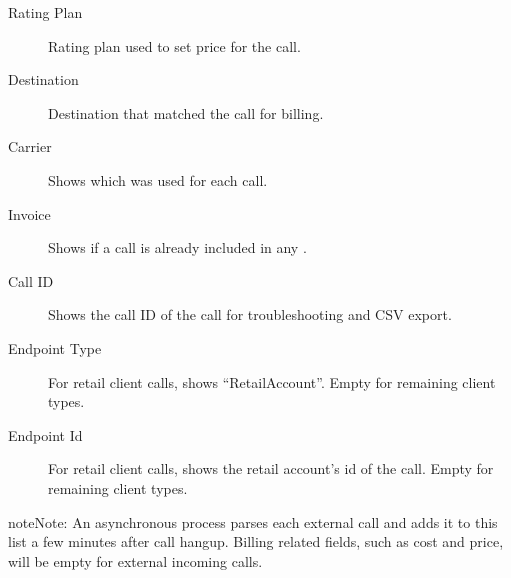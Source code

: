 \documentclass[letterpaper,10pt,english]{sphinxmanual}
\begin{document}
\begin{description}
\item[{Rating Plan}] \leavevmode{}\label{administration_portal/client/retail/calls/external_calls:term-rating-plan}
Rating plan used to set price for the call.

\item[{Destination}] \leavevmode{}\label{administration_portal/client/retail/calls/external_calls:term-destination}
Destination that matched the call for billing.

\item[{Carrier}] \leavevmode{}\label{administration_portal/client/retail/calls/external_calls:term-carrier}
Shows which {\hyperref[administration_portal/brand/providers/carriers:carriers]{}} was used for
each call.

\item[{Invoice}] \leavevmode{}\label{administration_portal/client/retail/calls/external_calls:term-invoice}
Shows if a call is already included in any {\hyperref[administration_portal/brand/invoicing/invoices:invoices]{}}.

\item[{Call ID}] \leavevmode{}\label{administration_portal/client/retail/calls/external_calls:term-call-id}
Shows the call ID of the call for troubleshooting and CSV export.

\item[{Endpoint Type}] \leavevmode{}\label{administration_portal/client/retail/calls/external_calls:term-endpoint-type}
For retail client calls, shows ``RetailAccount''. Empty for remaining client types.

\item[{Endpoint Id}] \leavevmode{}\label{administration_portal/client/retail/calls/external_calls:term-endpoint-id}
For retail client calls, shows the retail account's id of the call. Empty for remaining client types.

\end{description}

\begin{notice}{note}{Note:}
An asynchronous process parses each external call and adds it to this list a few minutes after call hangup. Billing related fields, such as cost and price, will be empty for external incoming calls.
\end{notice}
\end{document}
